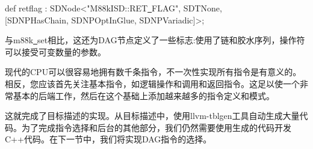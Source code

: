 \begin{tcolorbox}[colback=white,colframe=black]
def retflag : SDNode<"M88kISD::RET\underline{~}FLAG", SDTNone, \\
\hspace*{3cm}[SDNPHasChain, SDNPOptInGlue, SDNPVariadic]>;
\end{tcolorbox}

与m88k\underline{~}set相比，这还为DAG节点定义了一些标志:使用了链和胶水序列，操作符可以接受可变数量的参数。\par

\begin{tcolorbox}[colback=blue!5!white,colframe=blue!75!black, title=以迭代的方式实现这些指令]
	
现代的CPU可以很容易地拥有数千条指令，不一次性实现所有指令是有意义的。相反，您应该首先关注基本指令，如逻辑操作和调用和返回指令。这足以使一个非常基本的后端工作，然后在这个基础上添加越来越多的指令定义和模式。
\end{tcolorbox}

这就完成了目标描述的实现。从目标描述中，使用llvm-tblgen工具自动生成大量代码。为了完成指令选择和后台的其他部分，我们仍然需要使用生成的代码开发C++代码。在下一节中，我们将实现DAG指令的选择。\par





















